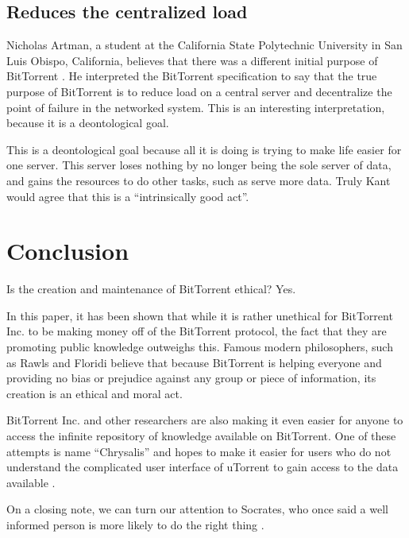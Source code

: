 \documentclass[11pt]{article}
\begin{document}
\begin{multicols}{2}
\subsection{Reduces the centralized load}

Nicholas Artman, a student at the California State Polytechnic University in San Luis Obispo, California, believes that there was a different initial purpose of BitTorrent \cite{artman}. He interpreted the BitTorrent specification to say that the true purpose of BitTorrent is to reduce load on a central server and decentralize the point of failure in the networked system. This is an interesting interpretation, because it is a deontological goal.

This is a deontological goal because all it is doing is trying to make life easier for one server. This server loses nothing by no longer being the sole server of data, and gains the resources to do other tasks, such as serve more data. Truly Kant would agree that this is a ``intrinsically good act''.

\section{Conclusion}

Is the creation and maintenance of BitTorrent ethical? Yes.

In this paper, it has been shown that while it is rather unethical for BitTorrent Inc. to be making money off of the BitTorrent protocol, the fact that they are promoting public knowledge outweighs this. Famous modern philosophers, such as Rawls and Floridi believe that because BitTorrent is helping everyone and providing no bias or prejudice against any group or piece of information, its creation is an ethical and moral act.

BitTorrent Inc. and other researchers are also making it even easier for anyone to access the infinite repository of knowledge available on BitTorrent. One of these attempts is name ``Chrysalis'' and hopes to make it easier for users who do not understand the complicated user interface of uTorrent to gain access to the data available \cite{chrysalis}.

On a closing note, we can turn our attention to Socrates, who once said a well informed person is more likely to do the right thing \cite{nphr}.

\end{multicols}

\newpage
\singlespacing


\end{document}
